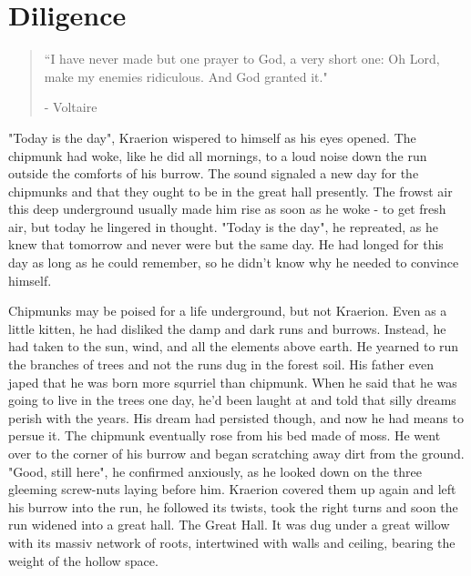 \documentclass[smalldemyvopaper,11pt,twoside,onecolumn,openright,extrafontsizes]{memoir}
\begin{document}
\chapter{Diligence}

\vspace{-1.3cm}
\begin{localsize}{10}
	\begin{quote}
		“I have never made but one prayer to God, a very short one: Oh Lord, make my enemies ridiculous. And God granted it."
		\begin{flushright}- Voltaire \end{flushright}
	\end{quote}
\end{localsize}
\vspace{1cm}

"Today is the day", Kraerion wispered to himself as his eyes opened. The chipmunk had woke, like he did all mornings, to a loud noise down the run outside the comforts of his burrow. The sound signaled a new day for the chipmunks and that they ought to be in the great hall presently. The frowst air this deep underground usually made him rise as soon as he woke - to get fresh air, but today he lingered in thought.
"Today is the day", he repreated, as he knew that tomorrow and never were but the same day. He had longed for this day as long as he could remember, so he didn't know why he needed to convince himself.

Chipmunks may be poised for a life underground, but not Kraerion. Even as a little kitten, he had disliked the damp and dark runs and burrows. Instead, he had taken to the sun, wind, and all the elements above earth. He yearned to run the branches of trees and not the runs dug in the forest soil. His father even japed that he was born more squrriel than chipmunk. When he said that he was going to live in the trees one day, he'd been laught at and told that silly dreams perish with the years. His dream had persisted though, and now he had means to persue it. 
  The chipmunk eventually rose from his bed made of moss. He went over to the corner of his burrow and began scratching away dirt from the ground.
"Good, still here", he confirmed anxiously, as he looked down on the three gleeming screw-nuts laying before him. Kraerion covered them up again and left his burrow into the run, he followed its twists, took the right turns and soon the run widened into a great hall. The Great Hall. It was dug under a great willow with its massiv network of roots, intertwined with walls and ceiling, bearing the weight of the hollow space.
\end{document}
